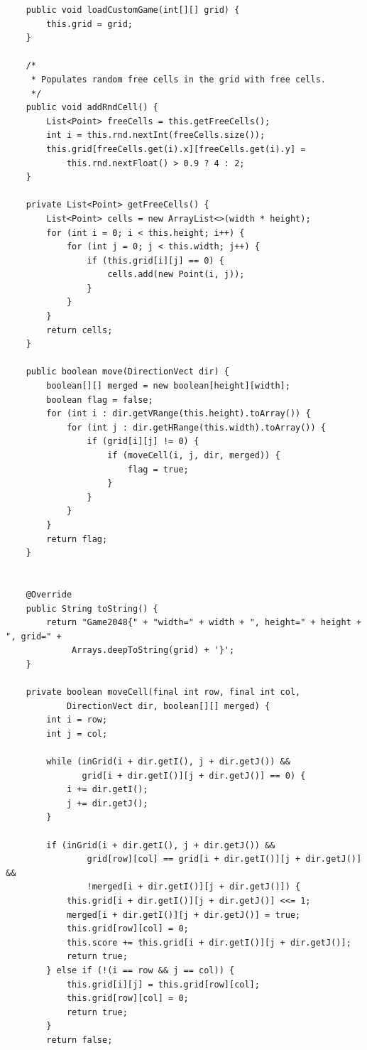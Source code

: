 \documentclass{article}
\begin{document}
\begin{verbatim}
    public void loadCustomGame(int[][] grid) {
        this.grid = grid;
    }

    /*
     * Populates random free cells in the grid with free cells.
     */
    public void addRndCell() {
        List<Point> freeCells = this.getFreeCells();
        int i = this.rnd.nextInt(freeCells.size());
        this.grid[freeCells.get(i).x][freeCells.get(i).y] = 
            this.rnd.nextFloat() > 0.9 ? 4 : 2;
    }

    private List<Point> getFreeCells() {
        List<Point> cells = new ArrayList<>(width * height);
        for (int i = 0; i < this.height; i++) {
            for (int j = 0; j < this.width; j++) {
                if (this.grid[i][j] == 0) {
                    cells.add(new Point(i, j));
                }
            }
        }
        return cells;
    }

    public boolean move(DirectionVect dir) {
        boolean[][] merged = new boolean[height][width];
        boolean flag = false;
        for (int i : dir.getVRange(this.height).toArray()) {
            for (int j : dir.getHRange(this.width).toArray()) {
                if (grid[i][j] != 0) {
                    if (moveCell(i, j, dir, merged)) {
                        flag = true;
                    }
                }
            }
        }
        return flag;
    }


    @Override
    public String toString() {
        return "Game2048{" + "width=" + width + ", height=" + height + ", grid=" + 
             Arrays.deepToString(grid) + '}';
    }

    private boolean moveCell(final int row, final int col, 
            DirectionVect dir, boolean[][] merged) {
        int i = row;
        int j = col;

        while (inGrid(i + dir.getI(), j + dir.getJ()) && 
               grid[i + dir.getI()][j + dir.getJ()] == 0) {
            i += dir.getI();
            j += dir.getJ();
        }

        if (inGrid(i + dir.getI(), j + dir.getJ()) && 
                grid[row][col] == grid[i + dir.getI()][j + dir.getJ()] && 
                !merged[i + dir.getI()][j + dir.getJ()]) {
            this.grid[i + dir.getI()][j + dir.getJ()] <<= 1;
            merged[i + dir.getI()][j + dir.getJ()] = true;
            this.grid[row][col] = 0;
            this.score += this.grid[i + dir.getI()][j + dir.getJ()];
            return true;
        } else if (!(i == row && j == col)) {
            this.grid[i][j] = this.grid[row][col];
            this.grid[row][col] = 0;
            return true;
        }
        return false;


\end{verbatim}
\end{document}
